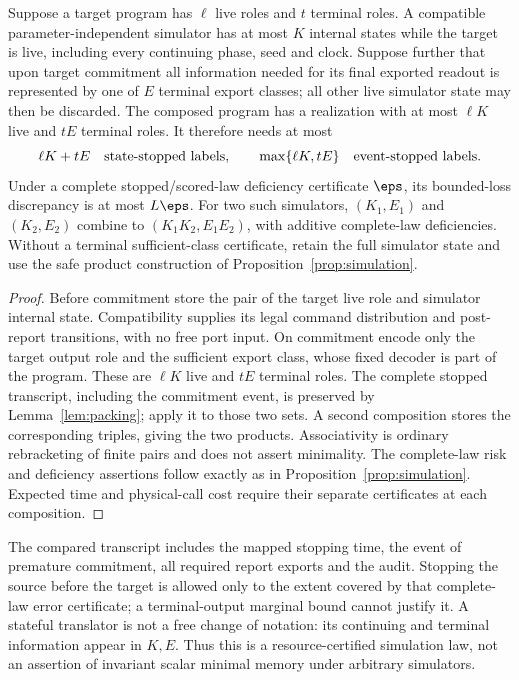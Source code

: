 \begin{proposition}\label{prop:role-composition}
Suppose a target program has $\ell$ live roles and $t$ terminal roles. A compatible parameter-independent simulator has at most $K$ internal states while the target is live, including every continuing phase, seed and clock. Suppose further that upon target commitment all information needed for its final exported readout is represented by one of $E$ terminal export classes; all other live simulator state may then be discarded. The composed program has a realization with at most $\ell K$ live and $tE$ terminal roles. It therefore needs at most
\[
 \ell K+tE\quad\hbox{state-stopped labels},\qquad
 \max\{\ell K,tE\}\quad\hbox{event-stopped labels}.
\]
Under a complete stopped/scored-law deficiency certificate $\eps$, its bounded-loss discrepancy is at most $L\eps$. For two such simulators, $(K_1,E_1)$ and $(K_2,E_2)$ combine to $(K_1K_2,E_1E_2)$, with additive complete-law deficiencies. Without a terminal sufficient-class certificate, retain the full simulator state and use the safe product construction of Proposition~\ref{prop:simulation}.
\end{proposition}
\begin{proof}
Before commitment store the pair of the target live role and simulator internal state. Compatibility supplies its legal command distribution and post-report transitions, with no free port input. On commitment encode only the target output role and the sufficient export class, whose fixed decoder is part of the program. These are $\ell K$ live and $tE$ terminal roles. The complete stopped transcript, including the commitment event, is preserved by Lemma~\ref{lem:packing}; apply it to those two sets. A second composition stores the corresponding triples, giving the two products. Associativity is ordinary rebracketing of finite pairs and does not assert minimality. The complete-law risk and deficiency assertions follow exactly as in Proposition~\ref{prop:simulation}. Expected time and physical-call cost require their separate certificates at each composition.
\end{proof}

The compared transcript includes the mapped stopping time, the event of premature commitment, all required report exports and the audit. Stopping the source before the target is allowed only to the extent covered by that complete-law error certificate; a terminal-output marginal bound cannot justify it. A stateful translator is not a free change of notation: its continuing and terminal information appear in $K,E$. Thus this is a resource-certified simulation law, not an assertion of invariant scalar minimal memory under arbitrary simulators.

